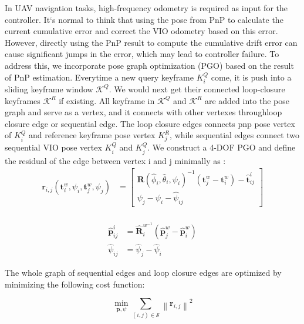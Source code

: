\documentclass[conference]{./support/ieeeconf}
\begin{document}
In UAV navigation tasks, high-frequency odometry is required as input for the controller. It`s normal to think that using the pose from PnP to calculate the current cumulative error and correct the VIO odometry based on this error. However, directly using the PnP result to compute the cumulative drift error can cause significant jumps in the error, which may lead to controller failure. To address this, we incorporate pose graph optimization (PGO) based on the result of PnP estimation. 
Everytime a new query keyframe $K^Q_i$ come, it is push into a sliding keyframe window  $\mathcal{K}^Q$. We would next get their connected loop-closure keyframes $\mathcal{K}^R$ if existing. All keyframe in $\mathcal{K}^Q$ and $\mathcal{K}^R$ are added into the pose graph and serve as a vertex, and it connects with other vertexes throughloop closure edge or sequential edge. The loop closure edges connects pnp pose vertex of $K^Q_i$ and reference keyframe pose vertex $K^R_j$, while sequential edges  connect two sequential VIO pose vertex $K^Q_i$ and $K^Q_{j}$. We construct a 4-DOF PGO and  define the residual of the edge between vertex i and j minimally as :
\begin{equation}
\begin{aligned}
\mathbf{r}_{i, j}\left(\mathbf{t}_i^w, \psi_i, \mathbf{t}_j^w, \psi_j\right)&=\left[\begin{array}{c}
\mathbf{R}\left(\hat{\phi}_i, \hat{\theta}_i, \psi_i\right)^{-1}\left(\mathbf{t}_j^w-\mathbf{t}_i^w\right)-\hat{\mathbf{t}}_{i j}^i \\
\psi_j-\psi_i-\hat{\psi}_{i j}
\end{array}\right] \\
\end{aligned}
\end{equation}

\begin{equation}
\begin{aligned}
 \hat{\mathbf{p}}_{i j}^i&=\hat{\mathbf{R}}_i^{w^{-1}}\left(\hat{\mathbf{p}}_j^w-\hat{\mathbf{p}}_i^w\right) \\
\hat{\psi}_{i j}&=\hat{\psi}_j-\hat{\psi}_i
\end{aligned}
\end{equation}


The whole graph of sequential edges and loop closure edges
are optimized by minimizing the following cost function:

\begin{equation}
\min_{\mathbf{p}, \psi} \sum_{(i, j) \in \mathcal{S}}\left\|\mathbf{r}_{i, j}\right\|^2
\end{equation}
\end{document}
